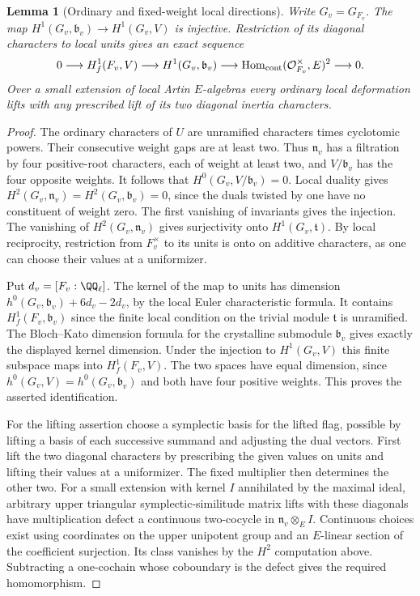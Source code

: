 \documentclass[a4paper,11pt]{article}
\newtheorem{lemma}[proposition]{Lemma}
\theoremstyle{definition}
\theoremstyle{remark}
\numberwithin{equation}{section}
\begin{document}
\begin{lemma}[Ordinary and fixed-weight local directions]
\leavevmode\label{lem:seedlocal580}
Write \(G_v=G_{F_v}\). The map \(H^1(G_v,\mathfrak b_v)\to
H^1(G_v,V)\) is injective. Restriction of its diagonal characters
to local units gives an exact sequence
\[
 0\longrightarrow H^1_f(F_v,V)\longrightarrow
 H^1(G_v,\mathfrak b_v)\longrightarrow
 \operatorname{Hom}_{\rm cont}(\mathcal O_{F_v}^{\times},E)^2
 \longrightarrow 0 .
\]
Over a small extension of local Artin \(E\)-algebras every ordinary
local deformation lifts with any prescribed lift of its two
diagonal inertia characters.
\end{lemma}
\begin{proof}
The ordinary characters of \(U\) are unramified characters times
cyclotomic powers. Their consecutive weight gaps are at least two.
Thus \(\mathfrak n_v\) has a filtration by four positive-root
characters, each of weight at least two, and \(V/\mathfrak b_v\)
has the four opposite weights. It follows that
\(H^0(G_v,V/\mathfrak b_v)=0\). Local duality gives
\(H^2(G_v,\mathfrak n_v)=H^2(G_v,\mathfrak b_v)=0\), since
the duals twisted by one have no constituent of weight zero.
The first vanishing of invariants gives the injection. The
vanishing of \(H^2(G_v,\mathfrak n_v)\) gives surjectivity
onto \(H^1(G_v,\mathfrak t)\). By local reciprocity, restriction
from \(F_v^\times\) to its units is onto on additive characters,
as one can choose their values at a uniformizer.

Put \(d_v=[F_v:\QQ_\ell]\). The kernel of the map to units
has dimension \(h^0(G_v,\mathfrak b_v)+6d_v-2d_v\), by the
local Euler characteristic formula. It contains
\(H^1_f(F_v,\mathfrak b_v)\) since the finite local condition
on the trivial module \(\mathfrak t\) is unramified. The
Bloch--Kato dimension formula for the crystalline submodule
\(\mathfrak b_v\) gives exactly the displayed kernel dimension.
Under the injection to \(H^1(G_v,V)\) this finite subspace
maps into \(H^1_f(F_v,V)\). The two spaces have equal dimension,
since \(h^0(G_v,V)=h^0(G_v,\mathfrak b_v)\) and both have four
positive weights. This proves the asserted identification.

For the lifting assertion choose a symplectic basis for the
lifted flag, possible by lifting a basis of each successive
summand and adjusting the dual vectors. First lift the two
diagonal characters by prescribing the given values on units
and lifting their values at a uniformizer. The fixed multiplier
then determines the other two. For a small extension with kernel
\(I\) annihilated by the maximal ideal, arbitrary upper triangular
symplectic-similitude matrix lifts with these diagonals have
multiplication defect a continuous two-cocycle in
\(\mathfrak n_v\otimes_E I\). Continuous choices exist using
coordinates on the upper unipotent group and an \(E\)-linear
section of the coefficient surjection. Its class vanishes by
the \(H^2\) computation above. Subtracting a one-cochain whose
coboundary is the defect gives the required homomorphism.
\end{proof}
\end{document}
